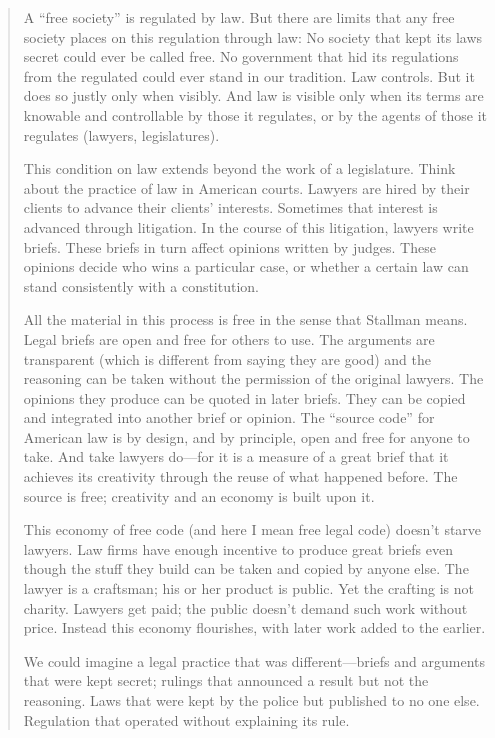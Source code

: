 \documentclass[12pt]{report}
\begin{document}
\begin{quotation}

A ``free society'' is regulated by law. But there are limits that any free
society places on this regulation through law: No society that kept its
laws secret could ever be called free. No government that hid its
regulations from the regulated could ever stand in our tradition. Law
controls.  But it does so justly only when visibly. And law is visible
only when its terms are knowable and controllable by those it regulates,
or by the agents of those it regulates (lawyers, legislatures).

This condition on law extends beyond the work of a legislature.  Think
about the practice of law in American courts.  Lawyers are hired by their
clients to advance their clients' interests. Sometimes that interest is
advanced through litigation. In the course of this litigation, lawyers
write briefs.  These briefs in turn affect opinions written by judges.
These opinions decide who wins a particular case, or whether a certain law
can stand consistently with a constitution.

All the material in this process is free in the sense that Stallman means.
Legal briefs are open and free for others to use.  The arguments are
transparent (which is different from saying they are good) and the
reasoning can be taken without the permission of the original lawyers.
The opinions they produce can be quoted in later briefs.  They can be
copied and integrated into another brief or opinion.  The ``source code''
for American law is by design, and by principle, open and free for anyone
to take. And take lawyers do---for it is a measure of a great brief that
it achieves its creativity through the reuse of what happened before.  The
source is free; creativity and an economy is built upon it.

This economy of free code (and here I mean free legal code) doesn't starve
lawyers.  Law firms have enough incentive to produce great briefs even
though the stuff they build can be taken and copied by anyone else.  The
lawyer is a craftsman; his or her product is public.  Yet the crafting is
not charity.  Lawyers get paid; the public doesn't demand such work
without price.  Instead this economy flourishes, with later work added to
the earlier.

We could imagine a legal practice that was different---briefs and
arguments that were kept secret; rulings that announced a result but not
the reasoning.  Laws that were kept by the police but published to no one
else.  Regulation that operated without explaining its rule.


\end{quotation}
\end{document}
